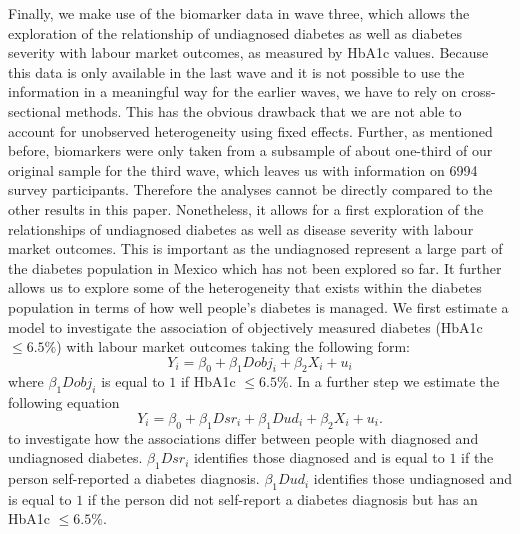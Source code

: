 Finally, we make use of the biomarker data in wave three, which allows
the exploration of the relationship of undiagnosed diabetes as well
as diabetes severity with labour market outcomes, as measured by \ac{HbA1c}
values. Because this data is only available in the last wave and it
is not possible to use the information in a meaningful way for the
earlier waves, we have to rely on cross-sectional methods. This has the
obvious drawback that we are not able to account for unobserved
heterogeneity using fixed effects. Further, as mentioned before, biomarkers
were only taken from a subsample of about one-third of our original sample
for the third wave, which leaves us with information on 6994 survey
participants. Therefore the analyses cannot be directly compared to
the other results in this paper. Nonetheless, it allows for a first
exploration of the relationships of undiagnosed diabetes as well as
disease severity with labour market outcomes. This is important as
the undiagnosed represent a large part of the diabetes population
in Mexico which has not been explored so far. It further allows us
to explore some of the heterogeneity that exists within the diabetes
population in terms of how well people's diabetes is managed. We first estimate a model to investigate the association of objectively measured diabetes (HbA1c $\leq6.5\%$) with labour market outcomes taking the following form:
\noindent 
\begin{equation}
Y_{i}=\beta_{0}+\beta_{1}Dobj_{i}+\beta_{2}X_{i}+u_{i}\label{eq:diab_objective}
\end{equation}
where $\beta_{1}Dobj_{i}$ is equal to $1$ if HbA1c $\leq6.5\%$.
In a further step we estimate the following equation
\noindent 
\begin{equation}
Y_{i}=\beta_{0}+\beta_{1}Dsr_{i}+\beta_{1}Dud_{i}+\beta_{2}X_{i}+u_{i}.\label{eq:diab_sr_ud}
\end{equation}
to investigate how the associations differ between people with diagnosed and undiagnosed diabetes. $\beta_{1}Dsr_{i}$ identifies those diagnosed and is equal to $1$ if the person self-reported a diabetes diagnosis.  $\beta_{1}Dud_{i}$ identifies those undiagnosed and is equal to $1$ if the person did not self-report a diabetes diagnosis but has an HbA1c $\leq6.5\%$.
  
  
  
  
  
  
  
  
  
  
  
  
  
  
  
  
  
  
  
  
  
  
  
  
  
  
  